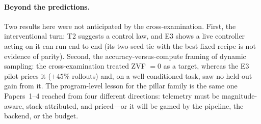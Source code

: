 \paragraph{Beyond the predictions.} Two results here were not anticipated
by the cross-examination. First, the interventional turn: T2 suggests a control law, and E3 shows a
live controller acting on it can run end to end (its two-seed tie with the
best fixed recipe is not evidence of parity). Second, the
accuracy-versus-compute framing of dynamic sampling: the cross-examination
treated ZVF $= 0$ as a target, whereas the E3 pilot prices it ($+45\%$
rollouts) and, on a well-conditioned task, saw no held-out gain from it. The
program-level lesson for the pillar family is the same one Papers~1--4
reached from four different directions: telemetry must be
magnitude-aware, stack-attributed, and priced---or it will be gamed by the
pipeline, the backend, or the budget.

